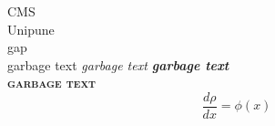 \documentclass{article}
\begin{document}
\begin{center}
{\Huge CMS}
{\\Unipune}
\vspace{30 mm}
{\\gap}
\vspace{30 mm}
\\ \textrm{garbage text \textit{garbage text \textbf{garbage text}}
\\ \textbf{\textsc{garbage text}}}
\begin{equation}
 \frac{d\rho}{dx}=\phi(x)
\end{equation}
\end {center}
\end{document}
